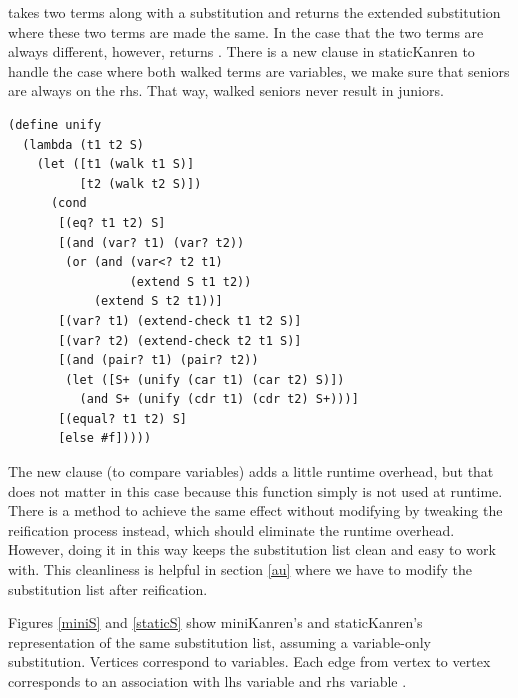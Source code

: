  takes two terms along with a substitution and returns the extended substitution where these two terms are made the same. In the case that the two terms are always different, however,  returns . There is a new clause in staticKanren to handle the case where both walked terms are variables, we make sure that seniors are always on the rhs. That way, walked seniors never result in juniors.
\begin{lstlisting}
(define unify
  (lambda (t1 t2 S)
    (let ([t1 (walk t1 S)]
          [t2 (walk t2 S)])
      (cond
       [(eq? t1 t2) S]
       [(and (var? t1) (var? t2))
        (or (and (var<? t2 t1)
                 (extend S t1 t2))
            (extend S t2 t1))]
       [(var? t1) (extend-check t1 t2 S)]
       [(var? t2) (extend-check t2 t1 S)]
       [(and (pair? t1) (pair? t2))
        (let ([S+ (unify (car t1) (car t2) S)])
          (and S+ (unify (cdr t1) (cdr t2) S+)))]
       [(equal? t1 t2) S]
       [else #f]))))
\end{lstlisting}

The new clause (to compare variables) adds a little runtime overhead, but that does not matter in this case because this function simply is not used at runtime. There is a method to achieve the same effect without modifying  by tweaking the reification process instead, which should eliminate the runtime overhead. However, doing it in this way keeps the substitution list clean and easy to work with. This cleanliness is helpful in section \ref{au} where we have to modify the substitution list after reification.

Figures \ref{miniS} and \ref{staticS} show miniKanren's and staticKanren's representation of the same substitution list, assuming a variable-only substitution. Vertices correspond to variables. Each edge from vertex  to vertex  corresponds to an association with lhs variable  and rhs variable .

